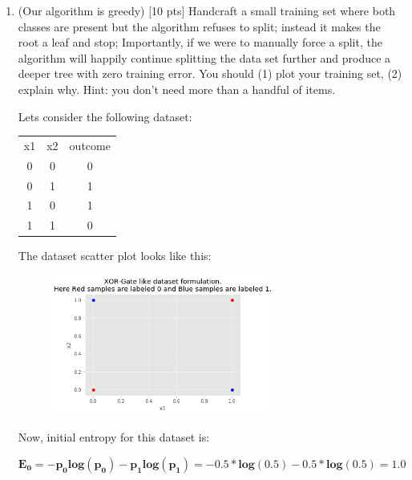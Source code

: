\documentclass[a4paper]{article}
\theoremstyle{definition}
\newenvironment{soln}{
    \leavevmode\color{blue}\ignorespaces
}{}
\begin{document}
\begin{enumerate}
\begin{soln}
\end{soln}

\item (Our algorithm is greedy)  [10 pts] Handcraft a small training set where both classes are present but the algorithm refuses to split; instead it makes the root a leaf and stop;
Importantly, if we were to manually force a split, the algorithm will happily continue splitting the data set further and produce a deeper tree with zero training error.
You should (1) plot your training set, (2) explain why.  Hint: you don't need more than a handful of items. 
	   
\begin{soln}
	Lets consider the following dataset: 
	\begin{center}
		\begin{tabular}{ c c c }
			x1 & x2 & outcome \\
			0 & 0 & 0 \\ 
			0 & 1 & 1 \\
			1 & 0 & 1 \\
			1 & 1 & 0  
		\end{tabular}
	\end{center}

The dataset scatter plot looks like this:
 \begin{figure}[H]
     \centering
     \includegraphics[width=0.7\textwidth]{q2.png}
     \captionsetup{labelformat=empty}
     \caption{}
     \label{fig:my_label}
 \end{figure}

Now, initial entropy for this dataset is: 

$$
\mathbf{E_0 = -p_0 log(p_0) - p_1 log(p_1) = - 0.5 * log(0.5) - 0.5 * log(0.5) = 1.0}
$$


\end{soln}
\end{enumerate}
\end{document}
